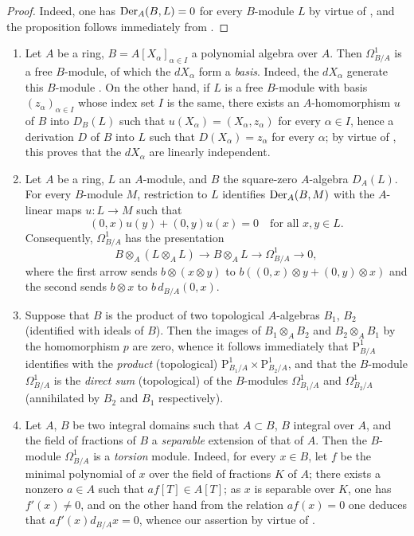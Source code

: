 \begin{proof}
Indeed, one has $\operatorname{Der}_A(B,L)=0$ for every $B$-module $L$ by virtue of , and the proposition follows immediately from .
\end{proof}

\begin{examples}[20.4.13]
\label{0.20.4.13}
\begin{enumerate}
  \item[\rm(i)] Let $A$ be a ring, $B=A[X_\alpha]_{\alpha\in I}$ a polynomial algebra over $A$.
Then $\Omega^1_{B/A}$ is a free $B$-module, of which the $dX_\alpha$ form a \emph{basis}.
Indeed, the $dX_\alpha$ generate this $B$-module .
On the other hand, if $L$ is a free $B$-module with basis $(z_\alpha)_{\alpha\in I}$ whose index set $I$ is the same, there exists an $A$-homomorphism $u$ of $B$ into $D_B(L)$ such that $u(X_\alpha)=(X_\alpha,z_\alpha)$ for every $\alpha\in I$, hence  a derivation $D$ of $B$ into $L$ such that $D(X_\alpha)=z_\alpha$ for every $\alpha$; by virtue of , this proves that the $dX_\alpha$ are linearly independent.
  \item[\rm(ii)] Let $A$ be a ring, $L$ an $A$-module, and $B$ the square-zero
  $A$-algebra $D_A(L)$. For every $B$-module $M$, restriction to $L$ identifies
  $\operatorname{Der}_A(B,M)$ with the $A$-linear maps $u:L\to M$ such that
  \[
    (0,x)u(y)+(0,y)u(x)=0\quad\text{for all }x,y\in L.
  \]
  Consequently, $\Omega^1_{B/A}$ has the presentation
  \[
    B\otimes_A(L\otimes_A L)\longrightarrow B\otimes_A L
    \longrightarrow\Omega^1_{B/A}\longrightarrow0,
  \]
  where the first arrow sends $b\otimes(x\otimes y)$ to
  $b((0,x)\otimes y+(0,y)\otimes x)$ and the second sends $b\otimes x$ to
  $b\,d_{B/A}(0,x)$.
  \item[\rm(iii)] Suppose that $B$ is the product of two topological $A$-algebras $B_1$, $B_2$ (identified with ideals of $B$).
Then the images of $B_1\otimes_A B_2$ and $B_2\otimes_A B_1$ by the homomorphism $p$  are zero, whence it follows immediately that $\mathrm{P}^1_{B/A}$ identifies with the \emph{product} (topological) $\mathrm{P}^1_{B_1/A}\times\mathrm{P}^1_{B_2/A}$, and that the $B$-module $\Omega^1_{B/A}$ is the \emph{direct sum} (topological) of the $B$-modules $\Omega^1_{B_1/A}$ and $\Omega^1_{B_2/A}$ (annihilated by $B_2$ and $B_1$ respectively).
  \item[\rm(iv)] Let $A$, $B$ be two integral domains such that $A\subset B$, $B$ integral over $A$, and the field of fractions of $B$ a \emph{separable} extension of that of $A$.
Then the $B$-module $\Omega^1_{B/A}$ is a \emph{torsion} module.
Indeed, for every $x\in B$, let $f$ be the minimal polynomial of $x$ over the field of fractions $K$ of $A$; there exists a nonzero $a\in A$ such that $af[T]\in A[T]$; as $x$ is separable over $K$, one has $f'(x)\neq 0$, and on the other hand from the relation $af(x)=0$ one deduces that $af'(x)d_{B/A}x=0$, whence our assertion by virtue of .
\end{enumerate}
\end{examples}

